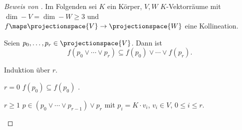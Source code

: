 \begin{proof}[Beweis von ]
  Im Folgenden sei \( K \) ein Körper, \( V,W \) \( K \)-Vektorräume mit \( \dim-{V}=\dim-{W}\geq 3 \) und \( f\maps \projectionspace{V}\to \projectionspace{W} \) eine Kollineation.
  \begin{lemma}\label{kollineation_erhaelt_verbindungsraum}
    Seien \( p_0,\dotsc,p_r\in \projectionspace{V} \). Dann ist
    \begin{equation*}
      f(p_0 \vee \dotsb\vee p_r)\subseteq f(p_0)\vee \dotsb\vee f(p_r).
    \end{equation*}
  \end{lemma}
  \begin{subproof}
    Induktion über \( r \).
    \begin{proofdescription}
      \item[\( r=0 \)] \( f(p_0)\subseteq f(p_0) \) \checkmark.
      \item[\( r\geq 1 \)] \( p\in (p_0\vee \dotsb\vee p_{r-1})\vee p_r \) mit \( p_i=K\cdot v_i \), \( v_i\in V \), \( 0\leq i\leq r \). 


\end{proofdescription}
\end{subproof}
\end{proof}
